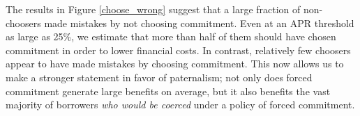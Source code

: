 \documentclass[oneside,11pt]{article}
\begin{document}
The results in Figure \ref{choose_wrong} suggest that a large fraction of non-choosers made mistakes by not choosing commitment.
Even at an APR threshold as large as 25\%, we estimate that more than half of them should have chosen commitment in order to lower financial costs.
In contrast, relatively few choosers appear to have made mistakes by choosing commitment.
This now allows us to make a stronger statement in favor of paternalism; not only does forced commitment generate large benefits on average, but it also benefits the vast majority of borrowers \emph{who would be coerced} under a policy of forced commitment.







\end{document}
